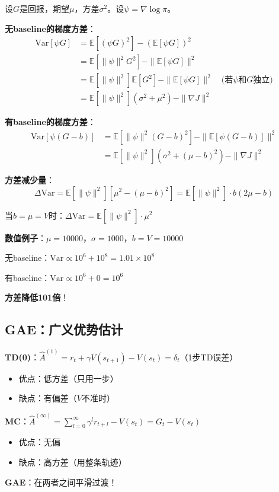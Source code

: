 \documentclass[11pt,a4paper]{article}
\theoremstyle{definition}
\begin{document}
\begin{calculation}[方差缩减的定量分析]
设$G$是回报，期望$\mu$，方差$\sigma^2$。设$\psi = \nabla \log \pi$。

\textbf{无baseline的梯度方差}：
\begin{align*}
\text{Var}[\psi G] &= \mathbb{E}[(\psi G)^2] - (\mathbb{E}[\psi G])^2 \\
&= \mathbb{E}[\|\psi\|^2 G^2] - \|\mathbb{E}[\psi G]\|^2 \\
&= \mathbb{E}[\|\psi\|^2] \mathbb{E}[G^2] - \|\mathbb{E}[\psi G]\|^2 \quad \text{(若$\psi$和$G$独立)}\\
&= \mathbb{E}[\|\psi\|^2] (\sigma^2 + \mu^2) - \|\nabla J\|^2
\end{align*}

\textbf{有baseline的梯度方差}：
\begin{align*}
\text{Var}[\psi (G-b)] &= \mathbb{E}[\|\psi\|^2 (G-b)^2] - \|\mathbb{E}[\psi (G-b)]\|^2 \\
&= \mathbb{E}[\|\psi\|^2] (\sigma^2 + (\mu - b)^2) - \|\nabla J\|^2
\end{align*}

\textbf{方差减少量}：
\[
\Delta \text{Var} = \mathbb{E}[\|\psi\|^2] [\mu^2 - (\mu - b)^2] = \mathbb{E}[\|\psi\|^2] \cdot b(2\mu - b)
\]

当$b = \mu = V$时：$\Delta \text{Var} = \mathbb{E}[\|\psi\|^2] \cdot \mu^2$

\textbf{数值例子}：$\mu = 10000$，$\sigma = 1000$，$b = V = 10000$

无baseline：$\text{Var} \propto 10^6 + 10^8 = 1.01 \times 10^8$

有baseline：$\text{Var} \propto 10^6 + 0 = 10^6$

\textbf{方差降低101倍}！
\end{calculation}

\subsection{GAE：广义优势估计}

\begin{plainwords}
\textbf{TD(0)}：$\hat{A}^{(1)} = r_t + \gamma V(s_{t+1}) - V(s_t) = \delta_t$（1步TD误差）
\begin{itemize}
    \item 优点：低方差（只用一步）
    \item 缺点：有偏差（$V$不准时）
\end{itemize}

\textbf{MC}：$\hat{A}^{(\infty)} = \sum_{l=0}^\infty \gamma^l r_{t+l} - V(s_t) = G_t - V(s_t)$
\begin{itemize}
    \item 优点：无偏
    \item 缺点：高方差（用整条轨迹）
\end{itemize}

\textbf{GAE}：在两者之间平滑过渡！
\end{plainwords}
\end{document}
